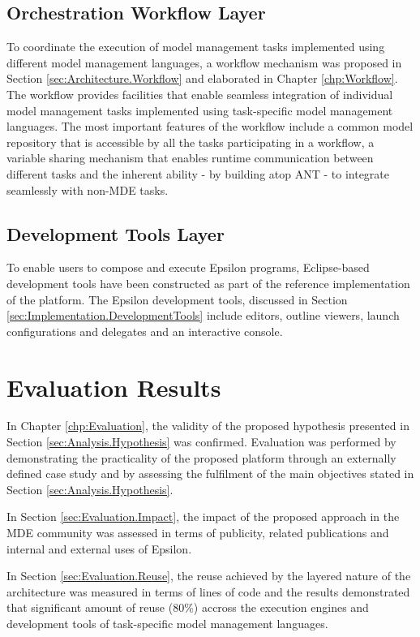 \subsection{Orchestration Workflow Layer}
To coordinate the execution of model management tasks implemented using different model management languages, a workflow mechanism was proposed in Section \ref{sec:Architecture.Workflow} and elaborated in Chapter \ref{chp:Workflow}. The workflow provides facilities that enable seamless integration of individual model management tasks implemented using task-specific model management languages. The most important features of the workflow include a common model repository that is accessible by all the tasks participating in a workflow, a variable sharing mechanism that enables runtime communication between different tasks and the inherent ability - by building atop ANT - to integrate seamlessly with non-MDE tasks.

\subsection{Development Tools Layer}
To enable users to compose and execute Epsilon programs, Eclipse-based development tools have been constructed as part of the reference implementation of the platform. The Epsilon development tools, discussed in Section \ref{sec:Implementation.DevelopmentTools} include editors, outline viewers, launch configurations and delegates and an interactive console.

\section{Evaluation Results}

In Chapter \ref{chp:Evaluation}, the validity of the proposed hypothesis presented in Section \ref{sec:Analysis.Hypothesis} was confirmed. Evaluation was performed by demonstrating the practicality of the proposed platform through an externally defined case study and by assessing the fulfilment of the main objectives stated in Section \ref{sec:Analysis.Hypothesis}. 

In Section \ref{sec:Evaluation.Impact}, the impact of the proposed approach in the MDE community was assessed in terms of publicity, related publications and internal and external uses of Epsilon. 

In Section \ref{sec:Evaluation.Reuse}, the reuse achieved by the layered nature of the architecture was measured in terms of lines of code and the results demonstrated that significant amount of reuse (80\%) accross the execution engines and development tools of task-specific model management languages.

